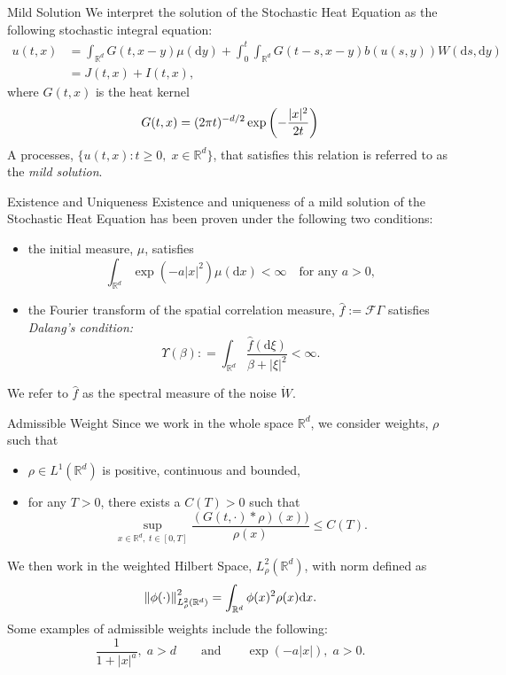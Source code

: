 \documentclass{beamer}%
\numberwithin{equation}{section}
\newcommand{\R}{\mathbb{R}}
\newcommand{\Norm}[1]{\left\|  #1   \right\|}
\newcommand{\ud}{\ensuremath{\mathrm{d} }}
\begin{document}
\begin{frame}{Mild Solution}
We interpret the solution of the Stochastic Heat Equation as the following stochastic integral equation: \vspace{.2in}
	\begin{align*}
			u(t,x) &= \int_{\R^d} G(t,x-y) \mu(\ud y) + \int_0^t \int_{\R^d}G(t-s,x-y)b(u(s,y))W(\ud s, \ud y) \\
		&= J(t,x) + I(t,x),
	\end{align*}
where $G(t,x)$ is the heat kernel \vspace{.1in}
	\[
		G(t,x) = (2 \pi t)^{-d/2} \exp\left(- \frac{|x|^2}{2t} \right) \vspace{.1in}
	\]
A processes, $\{u(t,x) : t \ge 0, \; x\in \R^d \}$, that satisfies this relation is referred to as the {\it mild solution}.
	\end{frame}
	
\begin{frame}{Existence and Uniqueness}
Existence and uniqueness of a mild solution of the Stochastic Heat Equation has been proven under the following two conditions: \vspace{.1in}
	\begin{itemize}
		\item the initial measure, $\mu$, satisfies 
			\[
				\int_{\R^d} \exp(-a|x|^2) \mu(\ud x) < \infty \quad \text{for any } a>0,
			\]
		\item the Fourier transform of the spatial correlation measure, $\hat{f} := \mathcal{F}\Gamma$ satisfies {\it Dalang's condition:}
			\[
				\Upsilon(\beta) : = \int_{\R^d} \frac{\hat{f}(\ud \xi)}{\beta + |\xi|^2} < \infty.
			\]
	\end{itemize}
We refer to $\hat{f}$ as the spectral measure of the noise $\dot{W}$. 
\end{frame}

\begin{frame}{Admissible Weight}
	Since we work in the whole space $\R^d$, we consider weights, $\rho$ such that \vspace{.1in}
		\begin{itemize}
			\item $\rho \in L^1(\R^d)$ is positive, continuous and bounded, \vspace{.1in}
			
			\item for any $T>0$, there exists a $C(T)>0$ such that 
			\[
				\sup_{x \in \R^d, \; t \in [0,T]} \frac{(G(t,\cdot) * \rho)(x))}{\rho(x)} \le C(T).
			\]
		\end{itemize}

We then work in the weighted Hilbert Space, $L^2_{\rho}(\R^d)$, with norm defined as
		\[
			\Norm{\phi(\cdot)}_{L^2_\rho(\R^d)}^2 = \int_{\R^d} \phi(x)^2 \rho(x) \ud x. \vspace{.1in}
		\] 
Some examples of admissible weights include the following:
	\[
		\frac{1}{1+|x|^a}, \; a >d \qquad \text{and} \qquad \exp(-a|x|), \; a>0.
	\]

\end{frame}
\end{document}
